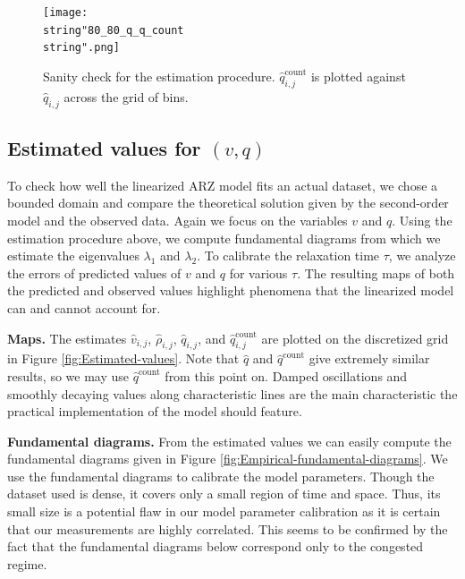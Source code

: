 \documentclass[preprint]{elsarticle}
\begin{document}
\begin{figure}[H]
\centering
\texttt{[image: \\string"80\_80\_q\_q\_count\\string".png]}
\protect\caption{Sanity check for the estimation procedure. $\widehat{q}_{i,j}^{\text{count}}$
is plotted against $\widehat{q}_{i,j}$ across the grid of bins.
\label{fig:Sanity-check}}
\end{figure}



\subsection{Estimated values for $\left(v,q\right)$} 

To check how well the linearized ARZ model fits an actual dataset, we chose a bounded domain and compare the theoretical solution given by the second-order model and the observed data. Again we focus on the variables $v$ and $q$. Using the estimation procedure above, we compute fundamental diagrams from which we estimate the eigenvalues $\lambda_{1}$ and $\lambda_{2}$.
To calibrate the relaxation time $\tau$, we analyze the errors of predicted values of $v$ and $q$ for various $\tau$. The resulting maps of both the predicted and observed values highlight phenomena that the linearized model can and cannot account for. 

\textbf{Maps.} The estimates $\widehat{v}_{i,j}$, $\widehat{\rho}_{i,j}$, $\widehat{q}_{i,j}$, and $\widehat{q}_{i,j}^{\text{count}}$ are plotted on the discretized grid in Figure \ref{fig:Estimated-values}. Note that $\widehat{q}$ and $\widehat{q}^{\text{count}}$ give extremely similar results, so we may use $\widehat{q}^{\text{count}}$ from this point on. Damped oscillations and smoothly decaying values along characteristic lines are the main characteristic the practical implementation of the model should feature.

\textbf{Fundamental diagrams.} From the estimated values we can easily compute the fundamental diagrams given in Figure \ref{fig:Empirical-fundamental-diagrams}. We use the fundamental diagrams to calibrate the model parameters. Though the dataset used is dense, it covers only a small region of time and space. Thus, its small size is a potential flaw in our model parameter calibration as it is certain that
our measurements are highly correlated. This seems
to be confirmed by the fact that the fundamental diagrams below correspond only to the congested regime. \
\end{document}
